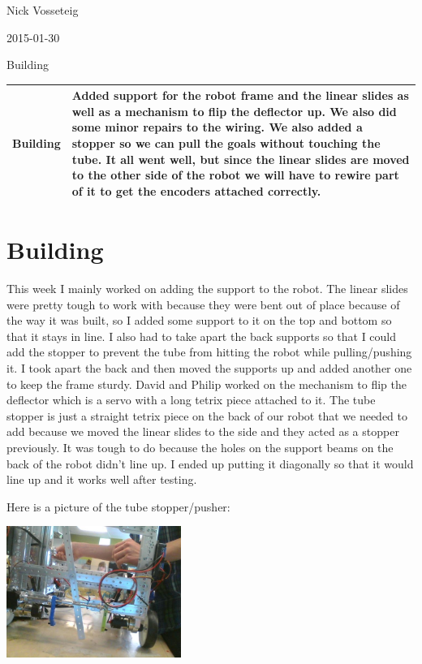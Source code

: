 Nick Vosseteig

2015-01-30

Building

\begin{tabular}{|p{5cm}|p{5cm}|}
 \hline
 Building&
 Added support for the robot frame and the linear slides as well as a mechanism to flip the deflector up. We also did some minor repairs to the wiring. We also added a stopper so we can pull the goals without touching the tube. It all went well, but since the linear slides are moved to the other side of the robot we will have to rewire part of it to get the encoders attached correctly.
 \\
 \hline
\end{tabular}

\section*{Building}
This week I mainly worked on adding the support to the robot. The linear slides were pretty tough to work with because they were bent out of place because of the way it was built, so I added some support to it on the top and bottom so that it stays in line. I also had to take apart the back supports so that I could add the stopper to prevent the tube from hitting the robot while pulling/pushing it. I took apart the back and then moved the supports up and added another one to keep the frame sturdy. David and Philip worked on the mechanism to flip the deflector which is a servo with a long tetrix piece attached to it. 
 The tube stopper is just a straight tetrix piece on the back of our robot that we needed to add because we moved the linear slides to the side and they acted as a stopper previously. It was tough to do because the holes on the support beams on the back of the robot didn’t line up. I ended up putting it diagonally so that it would line up and it works well after testing.	

Here is a picture of the tube stopper/pusher:
\begin{center}
 \includegraphics[width=215px]{./Entries/Images/stopper.jpg}
\end{center}

